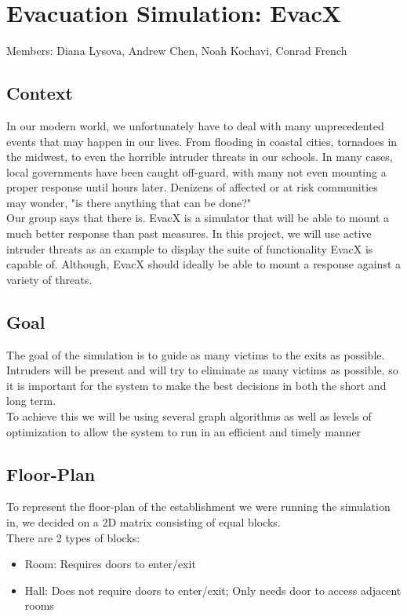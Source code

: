\documentclass[12pt]{article}
\begin{document}
\section*{\huge Evacuation Simulation: EvacX}
Members: Diana Lysova, Andrew Chen, Noah Kochavi, Conrad French 
\subsection*{Context} 
\hspace*{6mm} In our modern world, we unfortunately have to deal with many unprecedented events that may happen in our lives. From flooding in coastal cities, tornadoes in the midwest, to even the horrible intruder threats in our schools. In many cases, local governments have been caught off-guard, with many not even mounting a proper response until hours later. Denizens of affected or at risk communities may wonder, "is there anything that can be done?" \\[5pt]
\hspace*{6mm} Our group says that there is. EvacX is a simulator that will be able to mount a much better response than past measures. In this project, we will use active intruder threats as an example to display the suite of functionality EvacX is capable of. Although, EvacX should ideally be able to mount a response against a variety of threats.
\subsection*{Goal}
\hspace*{6mm} The goal of the simulation is to guide as many victims to the exits as possible. Intruders will be present and will try to eliminate as many victims as possible, so it is important for the system to make the best decisions in both the short and long term.\\[5pt]
\hspace*{6mm} To achieve this we will be using several graph algorithms as well as levels of optimization to allow the system to run in an efficient and timely manner
\subsection*{Floor-Plan}
To represent the floor-plan of the establishment we were running the simulation in, we decided on a 2D matrix consisting of equal blocks.\\[5pt]
There are 2 types of blocks:
\begin{itemize}
\item Room: Requires doors to enter/exit
\item Hall: Does not require doors to enter/exit; Only needs door 	  to access adjacent rooms
\end{itemize}
\end{document}
